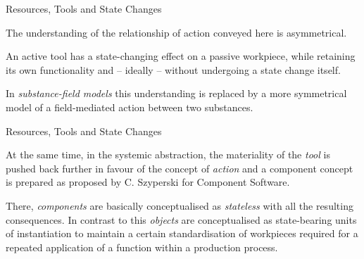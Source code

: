 \documentclass{beamer}
\begin{document}
\begin{frame}{Resources, Tools and State Changes} 

The understanding of the relationship of action conveyed here is asymmetrical.

An active tool has a state-changing effect on a passive workpiece, while
retaining its own functionality and -- ideally -- without undergoing a state
change itself.

In \emph{substance-field models} this understanding is replaced by a
more symmetrical model of a field-mediated action between two substances.

\begin{center}
\end{center}

\end{frame}

\begin{frame}{Resources, Tools and State Changes} 

At the same time, in the systemic abstraction, the materiality of the
\emph{tool} is pushed back further in favour of the concept of \emph{action}
and a component concept is prepared as proposed by C. Szyperski for Component
Software.

There, \emph{components} are basically conceptualised as \emph{stateless} with
all the resulting consequences. In contrast to this \emph{objects} are
conceptualised as state-bearing units of instantiation to maintain a certain
standardisation of workpieces required for a repeated application of a
function within a production process.

\end{frame}
\end{document}
